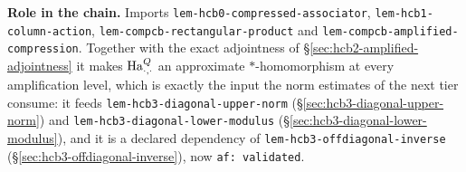 \noindent\textbf{Role in the chain.} Imports
\texttt{lem-hcb0-compressed-associator},
\texttt{lem-hcb1-column-action},
\texttt{lem-compcb-rectangular-product} and
\texttt{lem-compcb-amplified-compression}. Together with the exact adjointness of
\S\ref{sec:hcb2-amplified-adjointness} it makes $\mathrm{Ha}^{Q}_{\cdot,\cdot}$ an approximate
$*$-homomorphism at every amplification level, which is exactly the input the norm
estimates of the next tier consume: it feeds
\texttt{lem-hcb3-diagonal-upper-norm} (\S\ref{sec:hcb3-diagonal-upper-norm}) and
\texttt{lem-hcb3-diagonal-lower-modulus} (\S\ref{sec:hcb3-diagonal-lower-modulus}), and it
is a declared dependency of \texttt{lem-hcb3-offdiagonal-inverse}
(\S\ref{sec:hcb3-offdiagonal-inverse}), now \texttt{af: validated}.
